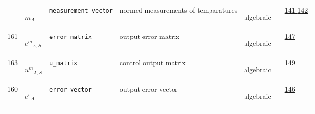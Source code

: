 \begin{longtable}{|p{1cm}|p{2.5cm}|p{4.5cm}|p{8cm}|p{3.0cm}|p{3cm}|p{1cm}|}
             & \hypertarget{"v:155"}{ $ {m}{_{A}} $}
             & \verb|measurement_vector|
             & normed measurements of temparatures
             & \begin{lay}algebraic \end{lay}
             & $  $
             &                 \hyperlink{"e:141"}{ 141 }
                                 \hyperlink{"e:142"}{ 142 }
                 \\
            161
             & \hypertarget{"v:161"}{ $ {{e^{m}}}{_{A, S}} $}
             & \verb|error_matrix|
             & output error matrix
             & \begin{lay}algebraic \end{lay}
             & $  $
             &                 \hyperlink{"e:147"}{ 147 }
                 \\
            163
             & \hypertarget{"v:163"}{ $ {{u^{m}}}{_{A, S}} $}
             & \verb|u_matrix|
             & control output matrix
             & \begin{lay}algebraic \end{lay}
             & $  $
             &                 \hyperlink{"e:149"}{ 149 }
                 \\
            160
             & \hypertarget{"v:160"}{ $ {{e^{v}}}{_{A}} $}
             & \verb|error_vector|
             & output error vector
             & \begin{lay}algebraic \end{lay}
             & $  $
             &                 \hyperlink{"e:146"}{ 146 }
                 \\
    \end{longtable}